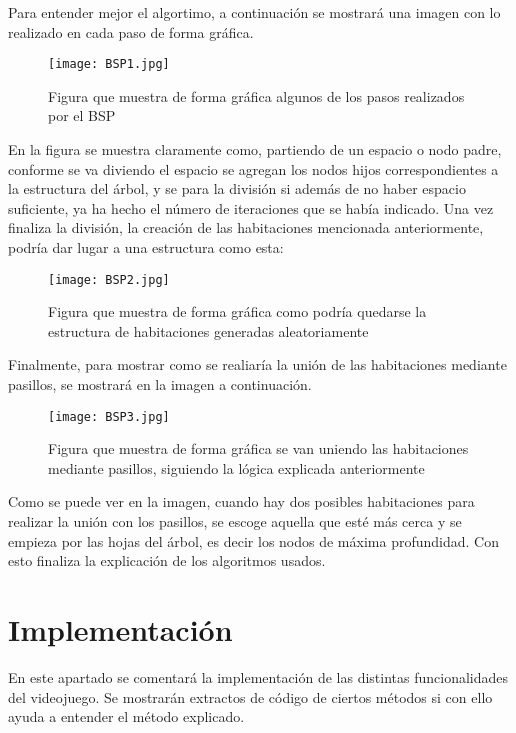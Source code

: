 Para entender mejor el algortimo, a continuación se mostrará una imagen con lo realizado en cada paso de forma gráfica.

\begin{figure}[H]
    \centering
    \texttt{[image: BSP1.jpg]}
    \caption{Figura que muestra de forma gráfica algunos de los pasos realizados por el BSP}
\end{figure}

En la figura se muestra claramente como, partiendo de un espacio o nodo padre, conforme se va diviendo el espacio se agregan los nodos hijos correspondientes a la estructura del árbol, y se para la división si además de no haber espacio suficiente, ya ha hecho el número de iteraciones que se había indicado. Una vez finaliza la división, la creación de las habitaciones mencionada anteriormente, podría dar lugar a una estructura como esta:

\begin{figure}[H]
    \centering
    \texttt{[image: BSP2.jpg]}
    \caption{Figura que muestra de forma gráfica como podría quedarse la estructura de habitaciones generadas aleatoriamente}
\end{figure}

Finalmente, para mostrar como se realiaría la unión de las habitaciones mediante pasillos, se mostrará en la imagen a continuación.

\begin{figure}[H]
    \centering
    \texttt{[image: BSP3.jpg]}
    \caption{Figura que muestra de forma gráfica se van uniendo las habitaciones mediante pasillos, siguiendo la lógica explicada anteriormente}
\end{figure}

Como se puede ver en la imagen, cuando hay dos posibles habitaciones para realizar la unión con los pasillos, se escoge aquella que esté más cerca y se empieza por las hojas del árbol, es decir los nodos de máxima profundidad. Con esto finaliza la explicación de los algoritmos usados.

\section{Implementación}

En este apartado se comentará la implementación  de las distintas funcionalidades del videojuego. Se mostrarán extractos de código de ciertos métodos si con ello ayuda a entender el método explicado.


